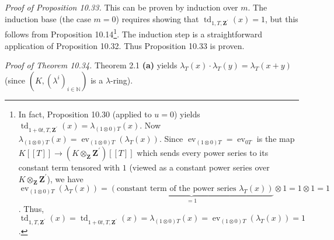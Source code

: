 \documentclass[numbers=enddot,12pt,final,onecolumn,notitlepage]{scrartcl}%
\begin{document}
\textit{Proof of Proposition 10.33.} This can be proven by induction over $m$.
The induction base (the case $m=0$) requires showing that $\operatorname*{td}%
\nolimits_{1,T,\mathbf{Z}^{\prime}}\left(  x\right)  =1$, but this follows
from Proposition 10.14\footnote{In fact, Proposition 10.30 (applied to $u=0$)
yields $\operatorname*{td}\nolimits_{1+0t,T,\mathbf{Z}^{\prime}}\left(
x\right)  =\lambda_{\left(  1\otimes0\right)  T}\left(  x\right)  $. Now
$\lambda_{\left(  1\otimes0\right)  T}\left(  x\right)  =\operatorname*{ev}%
\nolimits_{\left(  1\otimes0\right)  T}\left(  \lambda_{T}\left(  x\right)
\right)  $. Since $\operatorname*{ev}\nolimits_{\left(  1\otimes0\right)
T}=\operatorname*{ev}\nolimits_{0T}$ is the map $K\left[  \left[  T\right]
\right]  \rightarrow\left(  K\otimes_{\mathbf{Z}}\mathbf{Z}^{\prime}\right)
\left[  \left[  T\right]  \right]  $ which sends every power series to its
constant term tensored with $1$ (viewed as a constant power series over
$K\otimes_{\mathbf{Z}}\mathbf{Z}^{\prime}$), we have $\operatorname*{ev}%
\nolimits_{\left(  1\otimes0\right)  T}\left(  \lambda_{T}\left(  x\right)
\right)  =\underbrace{\left(  \text{constant term of the power series }%
\lambda_{T}\left(  x\right)  \right)  }_{=1}\otimes1=1\otimes1=1$. Thus,
$\operatorname*{td}\nolimits_{1,T,\mathbf{Z}^{\prime}}\left(  x\right)
=\operatorname*{td}\nolimits_{1+0t,T,\mathbf{Z}^{\prime}}\left(  x\right)
=\lambda_{\left(  1\otimes0\right)  T}\left(  x\right)  =\operatorname*{ev}%
\nolimits_{\left(  1\otimes0\right)  T}\left(  \lambda_{T}\left(  x\right)
\right)  =1$.}. The induction step is a straightforward application of
Proposition 10.32. Thus Proposition 10.33 is proven.

\textit{Proof of Theorem 10.34.} Theorem 2.1 \textbf{(a)} yields $\lambda
_{T}\left(  x\right)  \cdot\lambda_{T}\left(  y\right)  =\lambda_{T}\left(
x+y\right)  $ (since $\left(  K,\left(  \lambda^{i}\right)  _{i\in\mathbb{N}%
}\right)  $ is a $\lambda$-ring).
\end{document}
